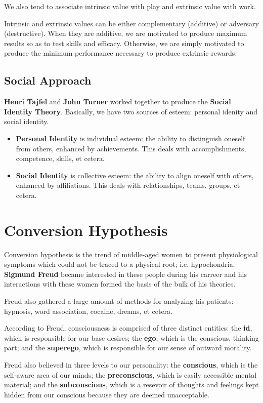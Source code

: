 \documentclass[12pt]{article}
\begin{document}
We also tend to associate intrinsic value with play and extrinsic value with work.

Intrinsic and extrinsic values can be either complementary (additive) or adversary (destructive). When they are additive, we are motivated to produce maximum results so as to test skills and efficacy. Otherwise, we are simply motivated to produce the minimum performance necessary to produce extrinsic rewards.

\subsection*{Social Approach}
{\bf Henri Tajfel} and {\bf John Turner} worked together to produce the {\bf Social Identity Theory}. Basically, we have two sources of esteem: personal idenity and social identity.
\begin{itemize}
\item {\bf Personal Identity} is individual esteem: the ability to distinguish oneself from others, enhanced by achievements. This deals with accomplishments, competence, skills, et cetera.
\item {\bf Social Identity} is collective esteem: the ability to align oneself with others, enhanced by affiliations. This deals with relationships, teams, groups, et cetera.
\end{itemize}

\section*{Conversion Hypothesis}
Conversion hypothesis is the trend of middle-aged women to present physiological symptoms which could not be traced to a physical root; i.e. hypochondria. {\bf Sigmund Freud} became interested in these people during his carreer and his interactions with these women formed the basis of the bulk of his theories.

Freud also gathered a large amount of methods for analyzing his patients: hypnosis, word association, cocaine, dreams, et cetera.

According to Freud, consciousness is comprised of three distinct entities: the {\bf id}, which is responsible for our base desires; the {\bf ego}, which is the conscious, thinking part; and the {\bf superego}, which is responsible for our sense of outward morality.

Freud also believed in three levels to our personality: the {\bf conscious}, which is the self-aware area of our minds; the {\bf preconscious}, which is easily accessible mental material; and the {\bf subconscious}, which is a resevoir of thoughts and feelings kept hidden from our conscious because they are deemed unacceptable.
\end{document}
